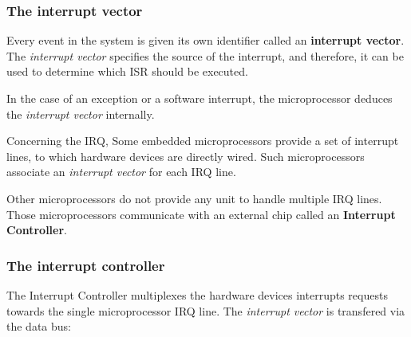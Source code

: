 \begin{frame}
  \frametitle{The interrupt vector}

  Every event in the system is given its own identifier called an
  {\bf interrupt vector}. The {\em interrupt vector} specifies the source of
  the interrupt, and therefore, it can be used to determine which ISR should
  be executed.

  \nl

  In the case of an exception or a software interrupt, the microprocessor
  deduces the {\em interrupt vector} internally.

  \nl

  Concerning the IRQ,
  Some embedded microprocessors provide a set of interrupt lines, to which
  hardware devices are directly wired. Such microprocessors associate an
  {\em interrupt vector} for each IRQ line.

  \nl

  Other microprocessors do not provide any unit to handle multiple IRQ lines.
  Those microprocessors communicate with an external chip called an
  {\bf Interrupt Controller}.


\end{frame}

%
%
%

\begin{frame}
  \frametitle{The interrupt controller}

  The Interrupt Controller multiplexes the hardware devices interrupts requests
  towards the single microprocessor IRQ line. The {\em interrupt vector} is
  transfered via the data bus:

  \nl

  \begin{center}
  \end{center}

\end{frame}

%
%
%


